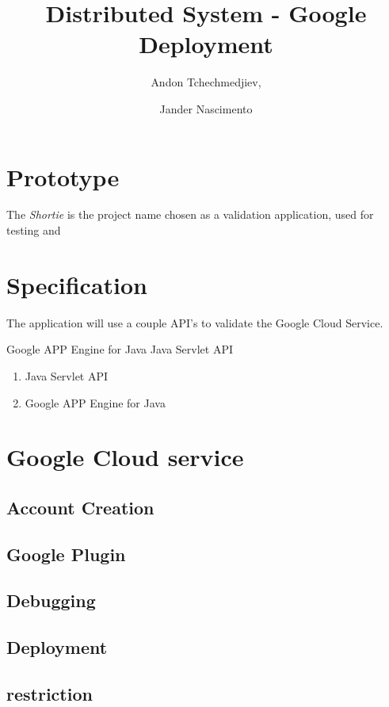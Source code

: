 \documentclass{article}
\begin{document}
\title{Distributed System - Google Deployment}

\author{Andon Tchechmedjiev, 
\and Jander Nascimento}

\maketitle

\section{Prototype}

The \emph{Shortie} is the project name chosen as a validation application, used for testing and 

\section{Specification}

The application will use a couple API's to validate the Google Cloud Service.

Google APP Engine for Java
Java Servlet API


\begin{enumerate}
\item Java Servlet API
\item Google APP Engine for Java
\end{enumerate}

\section{Google Cloud service}
\subsection{Account Creation}
\subsection{Google Plugin}
\subsection{Debugging}
\subsection{Deployment}
\subsection{restriction}
\end{document}
